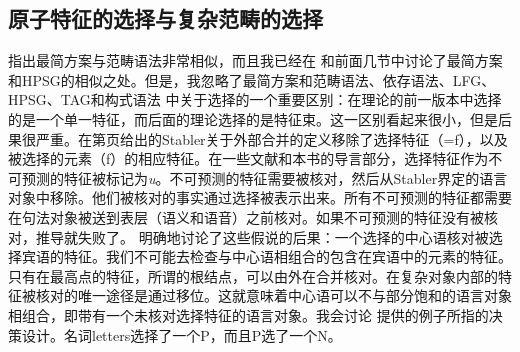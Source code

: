\subsection{原子特征的选择与复杂范畴的选择}
\label{sec-selection-features-vs-categories}

 \citet{BE95a}指出最简方案与范畴语法非常相似，而且我已经在 和前面几节中讨论了最简方案和HPSG的相似之处。但是，我忽略了最简方案和范畴语法\indexcgc、依存语法\indexdgc、LFG\indexlfgc、HPSG\indexhpsgc、TAG\indextagc 和构式语法\indexcxgc
中关于选择的一个重要区别：在理论的前一版本中选择的是一个单一特征，而后面的理论选择的是特征束。这一区别看起来很小，但是后果很严重。在第\pageref{Definition-EM}页给出的Stabler关于外部合并的定义移除了选择特征（=f），以及被选择的元素（f）的相应特征。在一些文献和本书的导言部分，选择特征作为不可预测的特征被标记为\emph{u}。不可预测的特征需要被核对，然后从Stabler界定的语言对象中移除。他们被核对的事实通过选择被表示出来。所有不可预测的特征都需要在句法对象被送到表层（语义和语音）之前核对。如果不可预测的特征没有被核对，推导就失败了。 \citet[\S~3.6]{Adger2003a}明确地讨论了这些假说的后果：一个选择的中心语核对被选择宾语的特征。我们不可能去检查与中心语相组合的包含在宾语中的元素的特征。只有在最高点的特征，所谓的根结点，可以由外在合并核对。在复杂对象内部的特征被核对的唯一途径是通过移位。这就意味着中心语可以不与部分饱和的语言对象相组合，即带有一个未核对选择特征的语言对象。我会讨论 \citet[]{Adger2003a}提供的例子所指的决策设计。名词letters选择了一个P，而且P选了一个N。
